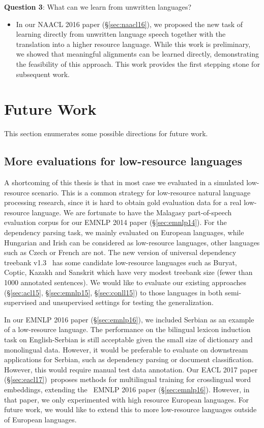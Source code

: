 \documentclass[12pt,twoside,final,hidelinks]{ltthesis}
\theoremstyle{definition}
\newcommand\emnlpivp{EMNLP 2014 paper (\S\ref{sec:emnlp14})}
\newcommand\naaclvip{NAACL 2016 paper (\S\ref{sec:naacl16})}
\newcommand\emnlpvip{EMNLP 2016 paper (\S\ref{sec:emnlp16})}
\newcommand\eaclviip{EACL 2017 paper (\S\ref{sec:eacl17})}
\begin{document}
\noindent\textbf{Question 3}: What can we learn from unwritten languages?
\begin{itemize}
\item In our \naaclvip, we proposed the new task of learning directly from unwritten language speech together with the translation into a higher resource language. While this work is preliminary, we showed that meaningful alignments can be learned directly, demonstrating the feasibility of this approach. This work provides the first stepping stone for 
subsequent work. %
\end{itemize}

\section{Future Work}
\label{sec:futurework}
\noindent This section enumerates some possible directions for future work. 
\subsection{More evaluations for low-resource languages} 
A shortcoming of this thesis is that in most case we evaluated in a simulated low-resource scenario.
This is a common strategy for low-resource natural language processing research, since it is hard to obtain gold evaluation data 
for a real low-resource language. We are fortunate to have the Malagasy part-of-speech evaluation corpus for our \emnlpivp. 
For the dependency parsing task, we mainly evaluated on European languages, while Hungarian and Irish can be considered as  
low-resource languages, other languages such as Czech or French are not. 
The new version of universal dependency 
treebank v1.3~\cite{11234/1-1699} has some candidate low-resource languages such as Buryat, Coptic, Kazakh and Sanskrit
which have very modest treebank size (fewer than 1000 annotated sentences). We would like to evaluate our existing approaches (\S\ref{sec:acl15}, \S\ref{sec:emnlp15}, \S\ref{sec:conll15}) to those languages in both semi-supervised and unsupervised settings for testing the generalization. 

In our \emnlpvip, we included Serbian as an example of a low-resource language. The performance on the bilingual lexicon induction 
task on English-Serbian is still acceptable given the small size of dictionary and monolingual data. However, it would be preferable to evaluate  
on downstream applications for Serbian, such as dependency parsing or document classification. However, this would require manual 
test data annotation. Our \eaclviip\  proposes methods for multilingual training for crosslingual word embeddings, extending the
~\emnlpvip. However, in that paper, we only experimented with high resource European languages. For future work, we would 
like to extend this to more low-resource languages outside of European languages. 
\end{document}
